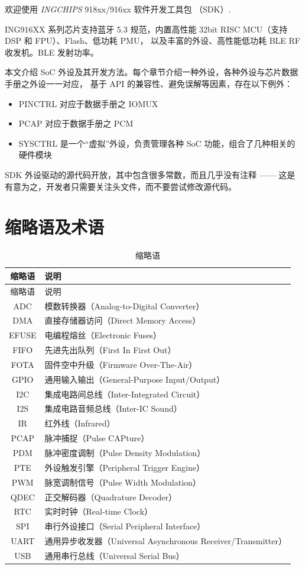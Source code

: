 \documentclass[
  12pt,
]{book}
\providecommand{\tightlist}{%
  \setlength{\itemsep}{0pt}\setlength{\parskip}{0pt}}
\begin{document}
欢迎使用 \emph{INGCHIPS} 918xx/916xx 软件开发工具包 （SDK）.

ING916XX 系列芯片支持蓝牙 5.3 规范，内置高性能 32bit RISC MCU（支持 DSP 和 FPU）、Flash、低功耗 PMU，
以及丰富的外设、高性能低功耗 BLE RF 收发机。BLE 发射功率。

本文介绍 SoC 外设及其开发方法。每个章节介绍一种外设，各种外设与芯片数据手册之外设一一对应，
基于 API 的兼容性、避免误解等因素，存在以下例外：

\begin{itemize}
\tightlist
\item
  PINCTRL 对应于数据手册之 IOMUX
\item
  PCAP 对应于数据手册之 PCM
\item
  SYSCTRL 是一个``虚拟''外设，负责管理各种 SoC 功能，组合了几种相关的硬件模块
\end{itemize}

SDK 外设驱动的源代码开放，其中包含很多常数，而且几乎没有注释 ------ 这是有意为之，开发者只需要关注头文件，而不要尝试修改源代码。

\hypertarget{ux7f29ux7565ux8bedux53caux672fux8bed}{%
\section{缩略语及术语}\label{ux7f29ux7565ux8bedux53caux672fux8bed}}

\begin{longtable}[]{@{}cl@{}}
\caption{\label{tab:ch0-abbreviations} 缩略语}\tabularnewline
\toprule
缩略语 & 说明\tabularnewline
\midrule
\endfirsthead
\toprule
缩略语 & 说明\tabularnewline
\midrule
\endhead
ADC & 模数转换器（Analog-to-Digital Converter）\tabularnewline
DMA & 直接存储器访问（Direct Memory Access）\tabularnewline
EFUSE & 电编程熔丝（Electronic Fuses）\tabularnewline
FIFO & 先进先出队列（First In First Out）\tabularnewline
FOTA & 固件空中升级（Firmware Over-The-Air）\tabularnewline
GPIO & 通用输入输出（General-Purpose Input/Output）\tabularnewline
I2C & 集成电路间总线（Inter-Integrated Circuit）\tabularnewline
I2S & 集成电路音频总线（Inter-IC Sound）\tabularnewline
IR & 红外线（Infrared）\tabularnewline
PCAP & 脉冲捕捉（Pulse CAPture）\tabularnewline
PDM & 脉冲密度调制（Pulse Density Modulation）\tabularnewline
PTE & 外设触发引擎（Peripheral Trigger Engine）\tabularnewline
PWM & 脉宽调制信号（Pulse Width Modulation）\tabularnewline
QDEC & 正交解码器（Quadrature Decoder）\tabularnewline
RTC & 实时时钟（Real-time Clock）\tabularnewline
SPI & 串行外设接口（Serial Peripheral Interface）\tabularnewline
UART & 通用异步收发器（Universal Asynchronous Receiver/Transmitter）\tabularnewline
USB & 通用串行总线（Universal Serial Bus）\tabularnewline
\bottomrule
\end{longtable}
\end{document}
